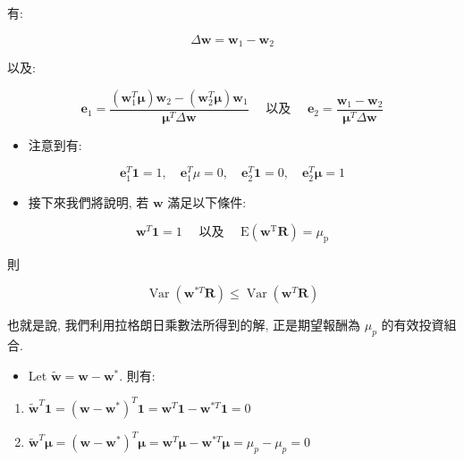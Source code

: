 \documentclass[letterpaper]{article}
\begin{document}
		有: 
		
		$$
		\Delta \mathbf{w}=\mathbf{w}_{1}-\mathbf{w}_{2}
		$$
		
		以及: 
		
		$$
		\mathbf{e}_{1}=\frac{\left (\mathbf{w}_{1}^{T} \boldsymbol{\mu}\right) \mathbf{w}_{2}-\left (\mathbf{w}_{2}^{T} \boldsymbol{\mu}\right) \mathbf{w}_{1}}{\boldsymbol{\mu}^{T} \Delta \mathbf{w}} \quad \text { 以及 } \quad \mathbf{e}_{2}=\frac{\mathbf{w}_{1}-\mathbf{w}_{2}}{\boldsymbol{\mu}^{T} \Delta \mathbf{w}}
		$$
		
		\begin{itemize}
			\item 注意到有: 
		\end{itemize}
		
		$$
		\mathbf{e}_{1}^{T} \mathbf{1}=1, \quad \mathbf{e}_{1}^{T} \mu=0, \quad \mathbf{e}_{2}^{T} \mathbf{1}=0, \quad \mathbf{e}_{2}^{T} \boldsymbol{\mu}=1
		$$
		
		\begin{itemize}
			\item 接下來我們將說明, 若 $\mathbf{w}$ 滿足以下條件: 
		\end{itemize}
		
		$$
		\mathbf{w}^{T} \mathbf{1}=1 \quad \text { 以及 } \quad \mathrm{E}\left (\mathbf{w}^{\mathrm{T}} \mathbf{R}\right) =\mu_{\mathrm{p}}
		$$
		
		則
		
		$$
		\operatorname{Var}\left (\mathbf{w}^{* T} \mathbf{R}\right) \leq \operatorname{Var}\left (\mathbf{w}^{T} \mathbf{R}\right) 
		$$
		
		也就是說, 我們利用拉格朗日乘數法所得到的解, 正是期望報酬為 $\mu_{p}$ 的有效投資組合.
		
		\begin{itemize}
			\item Let $\tilde{\mathbf{w}}=\mathbf{w}-\mathbf{w}^{*}$. 則有: 
		\end{itemize}
		
		\begin{enumerate}
			\item $\tilde{\mathbf{w}}^{T} \mathbf{1}=\left (\mathbf{w}-\mathbf{w}^{*}\right) ^{T} \mathbf{1}=\mathbf{w}^{T} \mathbf{1}-\mathbf{w}^{* T} \mathbf{1}=0$
			\item $\tilde{\mathbf{w}}^{T} \boldsymbol{\mu}=\left (\mathbf{w}-\mathbf{w}^{*}\right) ^{T} \boldsymbol{\mu}=\mathbf{w}^{T} \boldsymbol{\mu}-\mathbf{w}^{* T} \boldsymbol{\mu}=\mu_{p}-\mu_{p}=0$
		\end{enumerate}
		
\end{document}

